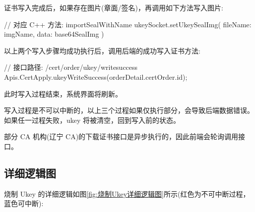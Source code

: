 证书写入完成后，如果存在图片(章面/签名)，再调用如下方法写入图片:

\begin{JavaScript}
// 对应 C++ 方法: importSealWithName 
ukeySocket.setUkeySealImg({ fileName: imgName, data: base64SealImg })
\end{JavaScript}

以上两个写入步骤均成功执行后，调用后端的成功写入证书方法:

\begin{JavaScript}
// 接口路径: /cert/order/ukey/writesuccess
Apis.CertApply.ukeyWriteSuccess(orderDetail.certOrder.id);
\end{JavaScript}

此时写入过程结束，系统界面将刷新。

写入过程是不可以中断的，以上三个过程如果仅执行部分，会导致后端数据错误。如果任一过程失败，ukey 将被清空，回到写入前的状态。

部分 CA 机构(辽宁 CA)的下载证书接口是异步执行的，因此前端会轮询调用接口。

\subsection*{详细逻辑图}

烧制 Ukey 的详细逻辑如图\ref{fig:烧制Ukey详细逻辑图}所示(红色为不可中断过程，蓝色可中断):

